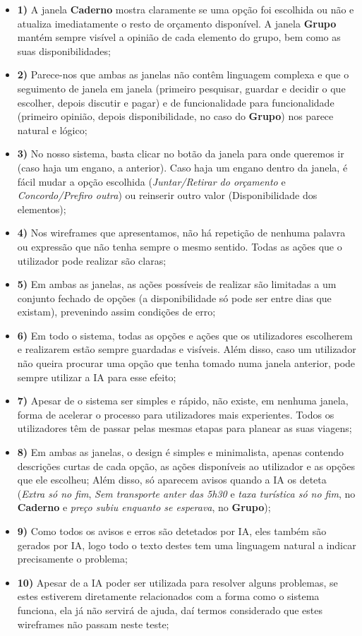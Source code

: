 \begin{itemize}
  \item \textbf{1)} A janela \textbf{Caderno} mostra claramente se uma opção foi escolhida ou não e atualiza imediatamente o resto de orçamento disponível.
          A janela \textbf{Grupo} mantém sempre visível a opinião de cada elemento do grupo, bem como as suas disponibilidades;
  \item \textbf{2)} Parece-nos que ambas as janelas não contêm linguagem complexa e que o seguimento  de janela em janela (primeiro pesquisar, guardar e decidir o que escolher, depois discutir e pagar) e de funcionalidade para funcionalidade (primeiro opinião, depois disponibilidade, no caso do \textbf{Grupo}) nos parece natural e lógico;
  \item \textbf{3)} No nosso sistema, basta clicar no botão da janela para onde queremos ir (caso haja um engano, a anterior).
        Caso haja um engano dentro da janela, é fácil mudar a opção escolhida (\textit{Juntar/Retirar do orçamento} e \textit{Concordo/Prefiro outra}) ou reinserir outro valor (Disponibilidade dos elementos);
  \item \textbf{4)} Nos wireframes que apresentamos, não há repetição de nenhuma palavra ou expressão que não tenha sempre o mesmo sentido. Todas as ações que o utilizador pode realizar são claras;
  \item \textbf{5)} Em ambas as janelas, as ações possíveis de realizar são limitadas a um conjunto fechado de opções (a disponibilidade só pode ser entre dias que existam), prevenindo assim condições de erro;
  \item \textbf{6)} Em todo o sistema, todas as opções e ações que os utilizadores escolherem e realizarem estão sempre guardadas e visíveis.
        Além disso, caso um utilizador não queira procurar uma opção que tenha tomado numa janela anterior, pode sempre utilizar a IA para esse efeito;
  \item \textbf{7)} Apesar de o sistema ser simples e rápido, não existe, em nenhuma janela, forma de acelerar o processo para utilizadores mais experientes. 
        Todos os utilizadores têm de passar pelas mesmas etapas para planear as suas viagens;
  \item \textbf{8)} Em ambas as janelas, o design é simples e minimalista, apenas contendo descrições curtas de cada opção, as ações disponíveis ao utilizador e as opções que ele escolheu;
        Além disso, só aparecem avisos quando a IA os deteta (\textit{Extra só no fim}, \textit{Sem transporte anter das 5h30} e \textit{taxa turística só no fim}, no \textbf{Caderno} e \textit{preço subiu enquanto se esperava}, no \textbf{Grupo});
  \item \textbf{9)} Como todos os avisos e erros são detetados por IA, eles também são gerados por IA, logo todo o texto destes tem uma linguagem natural a indicar precisamente o problema;
  \item \textbf{10)} Apesar de a IA poder ser utilizada para resolver alguns problemas, se estes estiverem diretamente relacionados com a forma como o sistema funciona, ela já não servirá de ajuda, daí termos considerado que estes wireframes não passam neste teste;
\end{itemize}

  

    
